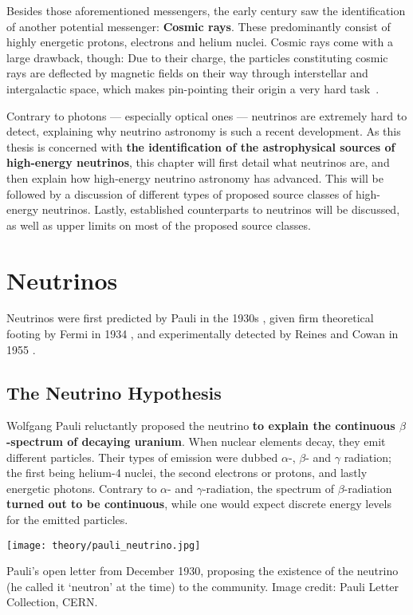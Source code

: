 Besides those aforementioned messengers, the early  century saw the identification of another potential messenger: \textbf{Cosmic rays}. These predominantly consist of highly energetic protons, electrons and helium nuclei. Cosmic rays come with a large drawback, though: Due to their charge, the particles constituting cosmic rays are deflected by magnetic fields on their way through interstellar and intergalactic space, which makes pin-pointing their origin a very hard task~\cite{Beckman2021}.

Contrary to photons --- especially optical ones --- neutrinos are extremely hard to detect, explaining why neutrino astronomy is such a recent development. As this thesis is concerned with \textbf{the identification of the astrophysical sources of high-energy neutrinos}, this chapter will first detail what neutrinos are, and then explain how high-energy neutrino astronomy has advanced. This will be followed by a discussion of different types of proposed source classes of high-energy neutrinos. Lastly, established counterparts to neutrinos will be discussed, as well as upper limits on most of the proposed source classes.

\section{Neutrinos}
Neutrinos were first predicted by Pauli in the 1930s , given firm theoretical footing by Fermi in 1934 , and experimentally detected by Reines and Cowan in 1955 .

\subsection{The Neutrino Hypothesis}\label{neutrino_hypothesis}
Wolfgang Pauli reluctantly proposed the neutrino \textbf{to explain the continuous $\beta$-spectrum of decaying uranium}. When nuclear elements decay, they emit different particles. Their types of emission were dubbed $\alpha$-, $\beta$- and $\gamma$ radiation; the first being helium-4 nuclei, the second electrons or protons, and lastly energetic photons. Contrary to $\alpha$- and $\gamma$-radiation, the spectrum of $\beta$-radiation \textbf{turned out to be continuous}, while one would expect discrete energy levels for the emitted particles.

\begin{marginfigure}
    \texttt{[image: theory/pauli\_neutrino.jpg]}
    \caption[Pauli's letter proposing the neutrino]{Pauli's open letter from December 1930, proposing the existence of the neutrino (he called it `neutron' at the time) to the community. Image credit: Pauli Letter Collection, CERN.}
\end{marginfigure}

